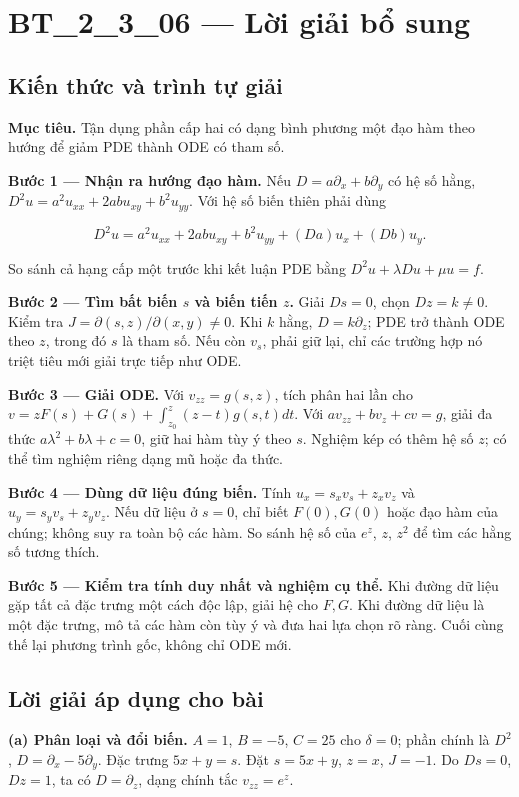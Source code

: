 \documentclass[10pt,a4paper]{article}
\begin{document}
\section*{BT\_2\_3\_06 — Lời giải bổ sung}
\subsection*{Kiến thức và trình tự giải}
\textbf{Mục tiêu.} Tận dụng phần cấp hai có dạng bình phương một đạo hàm theo hướng để giảm PDE thành ODE có tham số.

\textbf{Bước 1 — Nhận ra hướng đạo hàm.} Nếu $D=a\partial_x+b\partial_y$ có hệ số hằng, $D^2u=a^2u_{xx}+2ab u_{xy}+b^2u_{yy}$. Với hệ số biến thiên phải dùng


\[
D^2u=a^2u_{xx}+2ab u_{xy}+b^2u_{yy}+(Da)u_x+(Db)u_y.
\]


So sánh cả hạng cấp một trước khi kết luận PDE bằng $D^2u+\lambda Du+\mu u=f$.

\textbf{Bước 2 — Tìm bất biến $s$ và biến tiến $z$.} Giải $Ds=0$, chọn $Dz=k\ne0$. Kiểm tra $J=\partial(s,z)/\partial(x,y)\ne0$. Khi $k$ hằng, $D=k\partial_z$; PDE trở thành ODE theo $z$, trong đó $s$ là tham số. Nếu còn $v_s$, phải giữ lại, chỉ các trường hợp nó triệt tiêu mới giải trực tiếp như ODE.

\textbf{Bước 3 — Giải ODE.} Với $v_{zz}=g(s,z)$, tích phân hai lần cho $v=zF(s)+G(s)+\int_{z_0}^z(z-t)g(s,t)dt$. Với $a v_{zz}+b v_z+c v=g$, giải đa thức $a\lambda^2+b\lambda+c=0$, giữ hai hàm tùy ý theo $s$. Nghiệm kép có thêm hệ số $z$; có thể tìm nghiệm riêng dạng mũ hoặc đa thức.

\textbf{Bước 4 — Dùng dữ liệu đúng biến.} Tính $u_x=s_xv_s+z_xv_z$ và $u_y=s_yv_s+z_yv_z$. Nếu dữ liệu ở $s=0$, chỉ biết $F(0),G(0)$ hoặc đạo hàm của chúng; không suy ra toàn bộ các hàm. So sánh hệ số của $e^z$, $z$, $z^2$ để tìm các hằng số tương thích.

\textbf{Bước 5 — Kiểm tra tính duy nhất và nghiệm cụ thể.} Khi đường dữ liệu gặp tất cả đặc trưng một cách độc lập, giải hệ cho $F,G$. Khi đường dữ liệu là một đặc trưng, mô tả các hàm còn tùy ý và đưa hai lựa chọn rõ ràng. Cuối cùng thế lại phương trình gốc, không chỉ ODE mới.
\subsection*{Lời giải áp dụng cho bài}
\textbf{(a) Phân loại và đổi biến.} $A=1$, $B=-5$, $C=25$ cho $\delta=0$; phần chính là $D^2$, $D=\partial_x-5\partial_y$. Đặc trưng $5x+y=s$. Đặt $s=5x+y$, $z=x$, $J=-1$. Do $Ds=0$, $Dz=1$, ta có $D=\partial_z$, dạng chính tắc $v_{zz}=e^z$.
\end{document}
